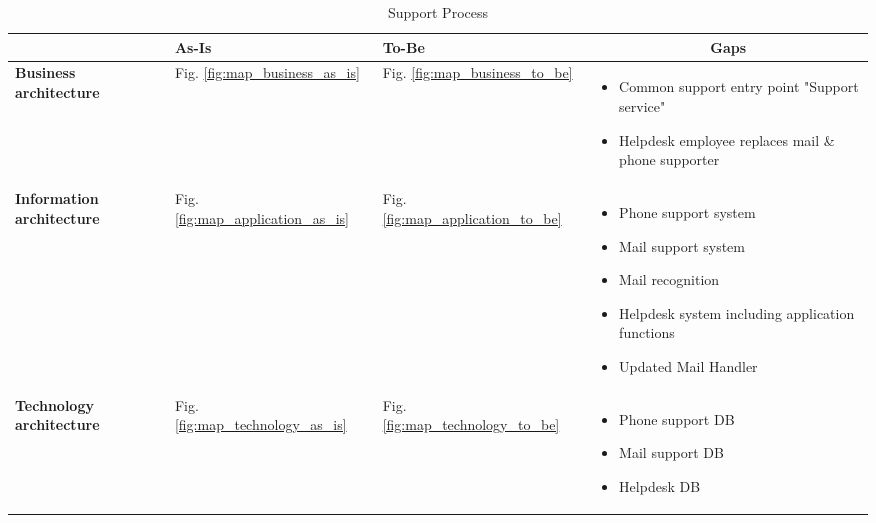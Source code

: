 \begin{table}[H]
	\centering
	\begin{tabular}{|p{2.4cm}|l|l|p{7.5cm}|}
		\hline
		\textbf{} & \textbf{As-Is} & \textbf{To-Be} & \multicolumn{1}{c|}{\textbf{Gaps}} \\ \hline
		\textbf{Business architecture} &Fig. \ref{fig:map_business_as_is}  & Fig. \ref{fig:map_business_to_be} & \begin{itemize}\vspace{-0.5cm}
		\item[$-$] Common support entry point "Support service"
		\item[$\pm$] Helpdesk employee replaces mail \& phone supporter
		\end{itemize}\vspace{-0.7cm} \\ \hline 

		\textbf{Information architecture} &Fig. \ref{fig:map_application_as_is}  & Fig. \ref{fig:map_application_to_be}  & \begin{itemize}\vspace{-0.5cm}
		\item[$-$] Phone support system
		\item[$-$] Mail support system
		\item[$-$] Mail recognition
		\item[$+$] Helpdesk system including application functions
		\item[$+$] Updated Mail Handler
		\end{itemize}\vspace{-0.7cm} \\ \hline

		\textbf{Technology architecture} &Fig. \ref{fig:map_technology_as_is}  & Fig. \ref{fig:map_technology_to_be}  & \begin{itemize}\vspace{-0.5cm}
		\item[$-$] Phone support DB
		\item[$-$] Mail support DB
		\item[$+$] Helpdesk DB
		\end{itemize}\vspace{-0.7cm} \\ \hline
	\end{tabular}	
	\caption{Support Process}
	\label{table:gaps_support}
\end{table}